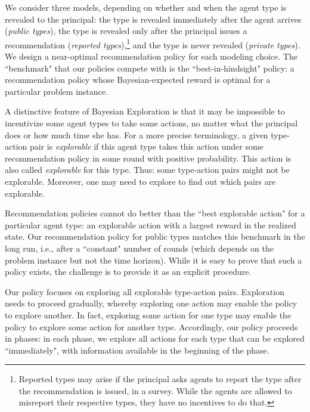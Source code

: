 We consider three models, depending on whether and when the agent type is revealed to the principal: the type is revealed immediately after the agent arrives (\emph{public types}), the type is revealed only after the principal issues a recommendation (\emph{reported types}),\footnote{Reported types may arise if
the principal asks agents to report the type after the recommendation is issued, \eg in a survey. While the agents are allowed to misreport their respective types, they have no incentives to do that.}
and the type is never revealed (\emph{private types}).
%
We design a near-optimal recommendation policy for each modeling choice. The ``benchmark" that our policies compete with is the ``best-in-hindsight"
policy: a recommendation policy whose Bayesian-expected reward is optimal for a particular problem instance.

A distinctive feature of Bayesian Exploration is that it may be impossible to incentivize some agent types to take some actions, no matter what the principal does or how much time she has. For a more precise terminology, a given type-action pair is \emph{explorable} if this agent type takes this action under some recommendation policy in some round with positive probability. This action is also called \emph{explorable} for this type. Thus: some type-action pairs might not be explorable. Moreover, one may need to explore to find out which pairs are explorable.

Recommendation policies cannot do better than the ``best explorable action" for a particular agent type: an explorable action with a largest reward in the realized state.  Our recommendation policy for public types matches this benchmark in the long run, i.e., after a ``constant" number of rounds (which depends on the problem instance but not the time horizon). While it is easy to prove that such a policy exists, the challenge is to provide it as an explicit procedure.

Our policy focuses on exploring all explorable type-action pairs. Exploration needs to proceed gradually, whereby exploring one action may enable the policy to explore another. In fact, exploring some action for one type may enable the policy to explore some action for another type. Accordingly, our policy proceeds in phases: in each phase, we explore all actions for each type that can be explored ``immediately", with information available in the beginning of the phase.


